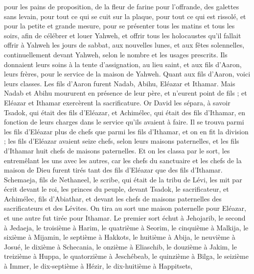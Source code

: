 \begin{multicols}{2}
pour les pains de proposition, de la fleur de farine pour l'offrande, des galettes sans levain, pour tout ce qui se cuit sur la plaque, pour tout ce qui est rissolé, et pour la petite et grande mesure,
pour se présenter tous les matins et tous les soirs, afin de célébrer et louer Yahweh,
et offrir tous les holocaustes qu'il fallait offrir à Yahweh les jours de sabbat, aux nouvelles lunes, et aux fêtes solennelles, continuellement devant Yahweh, selon le nombre et les usages prescrits.
Ils donnaient leurs soins à la tente d’assignation, au lieu saint, et aux fils d’Aaron, leurs frères, pour le service de la maison de Yahweh.
\VerseOne{}Quant aux fils d'Aaron, voici leurs classes. Les fils d’Aaron furent Nadab, Abihu, Eléazar et Ithamar.
Mais Nadab et Abihu moururent en présence de leur père, et n'eurent point de fils ; et Eléazar et Ithamar exercèrent la sacrificature.
Or David les sépara, à savoir Tsadok, qui était des fils d'Eléazar, et Achimélec, qui était des fils d'Ithamar, en fonction de leurs charges dans le service qu'ils avaient à faire.
Il se trouva parmi les fils d'Eléazar plus de chefs que parmi les fils d'Ithamar, et on en fit la division ; les fils d'Eléazar avaient seize chefs, selon leurs maisons paternelles, et les fils d'Ithamar huit chefs de maisons paternelles.
Et on les classa par le sort, les entremêlant les uns avec les autres, car les chefs du sanctuaire et les chefs de la maison de Dieu furent tirés tant des fils d'Eléazar que des fils d'Ithamar.
Schemaeja, fils de Nethaneel, le scribe, qui était de la tribu de Lévi, les mit par écrit devant le roi, les princes du peuple, devant Tsadok, le sacrificateur, et Achimélec, fils d'Abiathar, et devant les chefs de maisons paternelles des sacrificateurs et des Lévites. On tira au sort une maison paternelle pour Eléazar, et une autre fut tirée pour Ithamar.
Le premier sort échut à Jehojarib, le second à Jedaeja,
le troisième à Harim, le quatrième à Seorim,
le cinquième à Malkija, le sixième à Mijamin,
le septième à Hakkots, le huitième à Abija,
le neuvième à Josué, le dixième à Schecania,
le onzième à Eliaschib, le douzième à Jakim,
le treizième à Huppa, le quatorzième à Jeschébeab,
le quinzième à Bilga, le seizième à Immer,
le dix-septième à Hézir, le dix-huitième à Happitsets,

\end{multicols}
